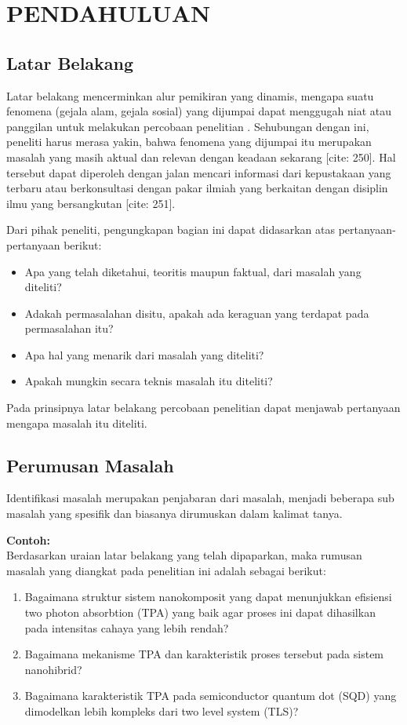 \chapter{PENDAHULUAN}

\section{Latar Belakang}
Latar belakang mencerminkan alur pemikiran yang dinamis, mengapa suatu fenomena (gejala alam, gejala sosial) yang dijumpai dapat menggugah niat atau panggilan untuk melakukan percobaan penelitian \parencite{dewi2022}. Sehubungan dengan ini, peneliti harus merasa yakin, bahwa fenomena yang dijumpai itu merupakan masalah yang masih aktual dan relevan dengan keadaan sekarang [cite: 250]. Hal tersebut dapat diperoleh dengan jalan mencari informasi dari kepustakaan yang terbaru atau berkonsultasi dengan pakar ilmiah yang berkaitan dengan disiplin ilmu yang bersangkutan [cite: 251].

Dari pihak peneliti, pengungkapan bagian ini dapat didasarkan atas pertanyaan-pertanyaan berikut:
\begin{itemize}
    \item Apa yang telah diketahui, teoritis maupun faktual, dari masalah yang diteliti?
    \item Adakah permasalahan disitu, apakah ada keraguan yang terdapat pada permasalahan itu?
    \item Apa hal yang menarik dari masalah yang diteliti?
    \item Apakah mungkin secara teknis masalah itu diteliti?
\end{itemize}
Pada prinsipnya latar belakang percobaan penelitian dapat menjawab pertanyaan mengapa masalah itu diteliti.

\section{Perumusan Masalah}
Identifikasi masalah merupakan penjabaran dari masalah, menjadi beberapa sub masalah yang spesifik dan biasanya dirumuskan dalam kalimat tanya.

\textbf{Contoh:} \\
Berdasarkan uraian latar belakang yang telah dipaparkan, maka rumusan masalah yang diangkat pada penelitian ini adalah sebagai berikut:
\begin{enumerate}
    \item Bagaimana struktur sistem nanokomposit yang dapat menunjukkan efisiensi two photon absorbtion (TPA) yang baik agar proses ini dapat dihasilkan pada intensitas cahaya yang lebih rendah?
    \item Bagaimana mekanisme TPA dan karakteristik proses tersebut pada sistem nanohibrid?
    \item Bagaimana karakteristik TPA pada semiconductor quantum dot (SQD) yang dimodelkan lebih kompleks dari two level system (TLS)?
\end{enumerate}

